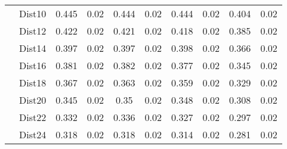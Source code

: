 \begin{table}[h]
\begin{tabular}{cccccccccc}
 & Dist10 & 0.445 & 0.02 & 0.444 & 0.02 & 0.444 & 0.02 & 0.404 & 0.02 \\
 & Dist12 & 0.422 & 0.02 & 0.421 & 0.02 & 0.418 & 0.02 & 0.385 & 0.02 \\
 & Dist14 & 0.397 & 0.02 & 0.397 & 0.02 & 0.398 & 0.02 & 0.366 & 0.02 \\
 & Dist16 & 0.381 & 0.02 & 0.382 & 0.02 & 0.377 & 0.02 & 0.345 & 0.02 \\
 & Dist18 & 0.367 & 0.02 & 0.363 & 0.02 & 0.359 & 0.02 & 0.329 & 0.02 \\
 & Dist20 & 0.345 & 0.02 & 0.35 & 0.02 & 0.348 & 0.02 & 0.308 & 0.02 \\
 & Dist22 & 0.332 & 0.02 & 0.336 & 0.02 & 0.327 & 0.02 & 0.297 & 0.02 \\
 & Dist24 & 0.318 & 0.02 & 0.318 & 0.02 & 0.314 & 0.02 & 0.281 & 0.02 \\
\bottomrule
\end{tabular}
\end{table}
